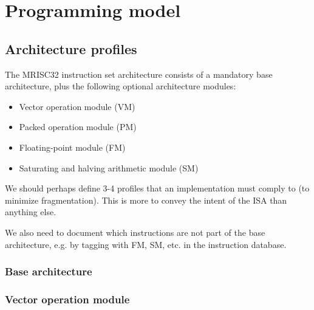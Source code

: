 %

\chapter{Programming model}

\section{Architecture profiles}

The MRISC32 instruction set architecture consists of a mandatory base
architecture, plus the following optional architecture modules:

\begin{itemize}
  \item Vector operation module (VM)
  \item Packed operation module (PM)
  \item Floating-point module (FM)
  \item Saturating and halving arithmetic module (SM)
\end{itemize}

\begin{todobox}
  We should perhaps define 3-4 profiles that an implementation must comply to
  (to minimize fragmentation). This is more to convey the intent of the ISA
  than anything else.

  We also need to document which instructions are not part of the base
  architecture, e.g. by tagging with FM, SM, etc. in the instruction database.
\end{todobox}

\subsection{Base architecture}

\tbd

\subsection{Vector operation module}


